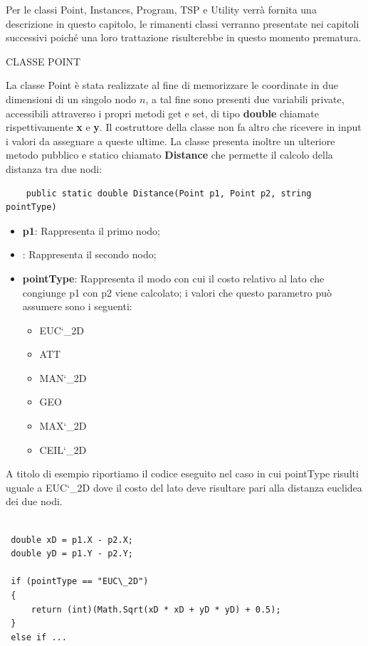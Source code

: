 \documentclass[11pt]{article}
\begin{document}
Per le classi Point, Instances, Program, TSP e Utility verr\`a fornita una descrizione in questo capitolo, le rimanenti classi verranno presentate nei capitoli successivi poich\'e una loro trattazione risulterebbe in questo momento prematura. 


\vspace{2\baselineskip}
CLASSE POINT
\vspace{2\baselineskip}

La classe Point \`e stata realizzate al fine di memorizzare le coordinate in due dimensioni di un singolo nodo $n$, a tal fine sono presenti due variabili private, accessibili attraverso i propri metodi get e set, di tipo \textbf{double} chiamate rispettivamente \textbf{x} e \textbf{y}. Il costruttore della classe non fa altro che ricevere in input i valori da assegnare a queste ultime. La classe presenta inoltre un ulteriore metodo pubblico e statico chiamato \textbf{Distance} che permette il calcolo della distanza tra due nodi:

\begin{lstlisting}
    public static double Distance(Point p1, Point p2, string pointType)
\end{lstlisting}

\begin{itemize}
\item \textbf{p1}: Rappresenta il primo nodo;
\item {}: Rappresenta il secondo nodo;
\item \textbf{pointType}: Rappresenta il modo con cui il costo relativo al lato che congiunge p1 con p2 viene calcolato; i valori che questo parametro pu\`o assumere sono i seguenti:
	\begin{itemize}
	\item EUC\char`\_2D
	\item ATT
	\item MAN\char`\_2D
	\item GEO
	\item MAX\char`\_2D	
	\item CEIL\char`\_2D
	\end{itemize}
\end{itemize}

A titolo di esempio riportiamo il codice eseguito nel caso in cui pointType risulti uguale a EUC\char`\_2D dove il costo del lato deve risultare pari alla distanza euclidea dei due nodi. 

\begin{lstlisting}

 double xD = p1.X - p2.X;
 double yD = p1.Y - p2.Y;
 
 if (pointType == "EUC\_2D")
 {
     return (int)(Math.Sqrt(xD * xD + yD * yD) + 0.5);
 }
 else if ...
            
\end{lstlisting}
\end{document}
